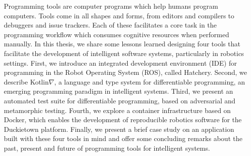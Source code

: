 \documentclass[12pt,initial,twoside,maitrise]{dms}
\numberwithin{equation}{section}
\numberwithin{table}{chapter}
\numberwithin{figure}{chapter}
\begin{document}
Programming tools are computer programs which help humans program computers. Tools come in all shapes and forms, from editors and compilers to debuggers and issue trackers. Each of these facilitates a core task in the programming workflow which consumes cognitive resources when performed manually. In this thesis, we share some lessons learned designing four tools that facilitate the development of intelligent software systems, particularly in robotics settings. First, we introduce an integrated development environment (IDE) for programming in the Robot Operating System (ROS), called Hatchery. Second, we describe Kotlin$\nabla$, a language and type system for differentiable programming, an emerging programming paradigm in intelligent systems. Third, we present an automated test suite for differentiable programming, based on adversarial and metamorphic testing. Fourth, we explore a container infrastructure based on Docker, which enables the development of reproducible robotics software for the Duckietown platform. Finally, we present a brief case study on an application built with these four tools in mind and offer some concluding remarks about the past, present and future of programming tools for intelligent systems.
\end{document}
